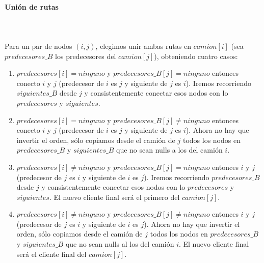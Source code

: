 \paragraph{Unión de rutas} \hspace{0pt} \\
\\
Para un par de nodos $(i,j)$, elegimos unir ambas rutas en $camion[i]$ (sea $predecesores\_B$ los predecesores del $camion[j]$), obteniendo cuatro casos:
\begin{enumerate}
	\item $predecesores[i]=ninguno$  y $predecesores\_B[j] = ninguno$ entonces conecto $i$ y $j$ (predecesor de $i$ es $j$ y siguiente de $j$ es $i$). Iremos recorriendo $siguientes\_B$ desde $j$ y consistentemente conectar esos nodos con lo $predecesores$ y $siguientes$. 
	\item $predecesores[i]=ninguno$  y $predecesores\_B[j] \neq ninguno$ entonces conecto $i$ y $j$ (predecesor de $i$ es $j$ y siguiente de $j$ es $i$). Ahora no hay que invertir el orden, sólo copiamos desde el camión de $j$ todos los nodos en $predecesores\_B$ y $siguientes\_B$ que no sean nulls a los del camión $i$.
	\item $predecesores[i] \neq ninguno$ y $predecesores\_B[j] = ninguno$ entonces  $i$ y $j$ (predecesor de $j$ es $i$ y siguiente de $i$ es $j$). Iremos recorriendo $predecesores\_B$ desde $j$ y consistentemente conectar esos nodos con lo $predecesores$ y $siguientes$. El nuevo cliente final será el primero del $camion[j]$.
	\item $predecesores[i] \neq ninguno$ y $predecesores\_B[j] \neq ninguno$ entonces  $i$ y $j$ (predecesor de $j$ es $i$ y siguiente de $i$ es $j$). Ahora no hay que invertir el orden, sólo copiamos desde el camión de $j$ todos los nodos en $predecesores\_B$ y $siguientes\_B$ que no sean nulls al los del camión $i$. El nuevo cliente final será el cliente final del $camion[j]$.
\end{enumerate}